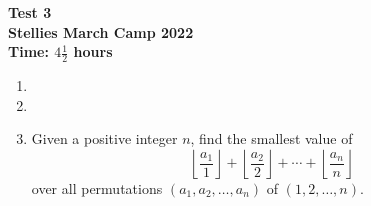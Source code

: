\documentclass{article}
\begin{document}
\thispagestyle{empty}

\begin{center}
  \textbf{\Large Test 3}
  \\ \vspace{1em}
  \textbf{\large Stellies March Camp 2022}
  \\ \vspace{1em}
  \textbf{\large Time: $4\frac{1}{2}$ hours}
\end{center}

\vspace{24pt}

\begin{enumerate}[itemsep=12pt]

\item %


\item %


\item %
\newcommand{\floorf}[2]{\left\lfloor\frac{#1}{#2}\right\rfloor}
Given a positive integer $n$, find the smallest value of
\[ \floorf{a_1}{1} +\floorf{a_2}{2} +\dotsb +\floorf{a_n}{n} \]
over all permutations $(a_1, a_2, \dotsc, a_n)$ of $(1, 2, \dotsc, n)$.

\end{enumerate}

\vfill
\centering
\begin{BVerbatim}
\end{BVerbatim}
\end{document}

